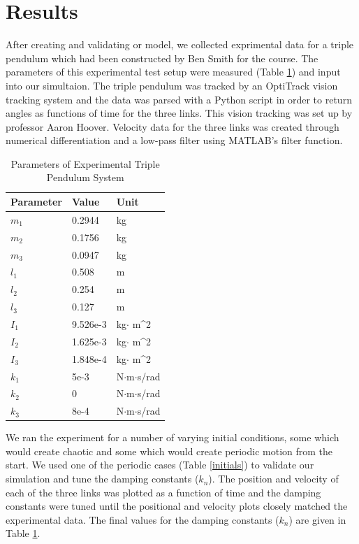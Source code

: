 \section{Results}
After creating and validating or model, we collected exprimental data for a triple pendulum which had been constructed by Ben Smith for the course.  The parameters of this experimental test setup were measured (Table \ref{expparams}) and input into our simultaion.  The triple pendulum was tracked by an OptiTrack vision tracking system and the data was parsed with a Python script in order to return angles as functions of time for the three links.  This vision tracking was set up by professor Aaron Hoover.  Velocity data for the three links was created through numerical differentiation and a low-pass filter using MATLAB's filter function.

\begin{table}[H]
\centering
 \begin{tabular}{|l|l|l|}
        \hline
        Parameter & Value    & Unit        \\ \hline
        $m_1$     & 0.2944   & kg          \\ 
        $m_2$     & 0.1756   & kg          \\ 
        $m_3$     & 0.0947   & kg          \\ 
        $l_1$     & 0.508    & m           \\ 
        $l_2$     & 0.254    & m           \\ 
        $l_3$     & 0.127    & m           \\ 
        $I_1$     & 9.526e-3 & kg$\cdot$ m^2 \\ 
        $I_2$     & 1.625e-3 & kg$\cdot$ m^2 \\ 
        $I_3$     & 1.848e-4 & kg$\cdot$ m^2 \\ 
        $k_1$     & 5e-3     & N$\cdot$m$\cdot$s/rad           \\ 
        $k_2$     & 0        & N$\cdot$m$\cdot$s/rad           \\ 
        $k_3$     & 8e-4     & N$\cdot$m$\cdot$s/rad           \\
        \hline
    \end{tabular}
    \caption{Parameters of Experimental Triple Pendulum System}
    \label{expparams}
\end{table}

We ran the experiment for a number of varying initial conditions, some which would create chaotic and some which would create periodic motion from the start.  We used one of the periodic cases (Table \ref{initials}) to validate our simulation and tune the damping constants ($k_n$).  The position and velocity of each of the three links was plotted as a function of time and the damping constants were tuned until the positional and velocity plots closely matched the experimental data.  The final values for the damping constants ($k_n$) are given in Table \ref{expparams}.

